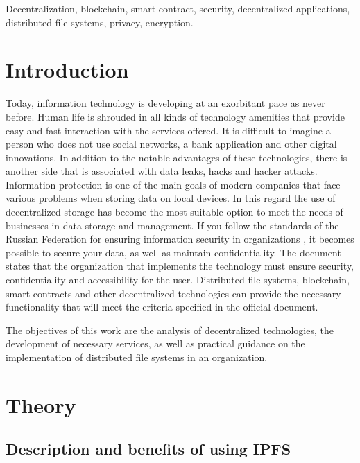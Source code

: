 \documentclass[10pt,conference,a4paper]{IEEEtran_EDM}
\begin{document}
\begin{IEEEkeywords}
Decentralization, blockchain, smart contract, security, decentralized applications, distributed file systems, privacy, encryption.
\end{IEEEkeywords}

\section{Introduction}
Today, information technology is developing at an exorbitant pace as never before.
Human life is shrouded in all kinds of technology amenities that provide easy and fast interaction with the services offered.
It is difficult to imagine a person who does not use social networks, a bank application and other digital innovations.
In addition to the notable advantages of these technologies, there is another side that is associated with data leaks, hacks and hacker attacks.
Information protection is one of the main goals of modern companies that face various problems when storing data on local devices.
In this regard the use of decentralized storage has become the most suitable option to meet the needs of businesses in data storage and management.
If you follow the standards of the Russian Federation for ensuring information security in organizations \cite{GOST53114}, it becomes possible to secure your data, as well as maintain confidentiality.
The document states that the organization that implements the technology must ensure security, confidentiality and accessibility for the user.
Distributed file systems, blockchain, smart contracts and other decentralized technologies can provide the necessary functionality that will meet the criteria specified in the official document.

The objectives of this work are the analysis of decentralized technologies, the development of necessary services, as well as practical guidance on the implementation of distributed file systems in an organization.

\section{Theory}

\subsection{Description and benefits of using IPFS}
\end{document}
